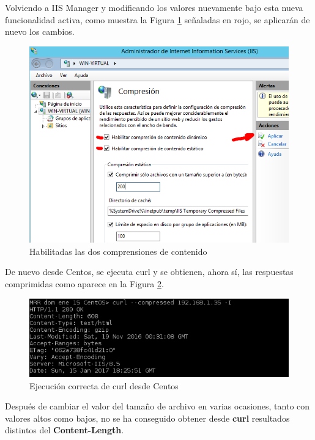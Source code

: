 Volviendo a IIS Manager y modificando los valores nuevamente bajo esta nueva funcionalidad activa, como muestra la Figura \ref{fig:figura5-6} señaladas en rojo, se aplicarán de nuevo los cambios.
	\begin{figure}[H] %
		\centering
		\includegraphics[scale=0.8]{figuras/ejercicio5/figura5-6.png} 
		\caption{Habilitadas las dos comprensiones de contenido} 
		\label{fig:figura5-6}
	\end{figure}
\vspace{-10pt}
De nuevo desde Centos, se ejecuta curl y se obtienen, ahora sí, las respuestas comprimidas como aparece en la Figura \ref{fig:figura5-7}.
	\begin{figure}[H] %
		\centering
		\includegraphics[scale=0.9]{figuras/ejercicio5/figura5-7.png} 
		\caption{Ejecución correcta de curl desde Centos} 
		\label{fig:figura5-7}
	\end{figure}
\vspace{-10pt}
Después de cambiar el valor del tamaño de archivo en varias ocasiones, tanto con valores altos como bajos, no se ha conseguido obtener desde \textbf{curl} resultados distintos del \textbf{Content-Length}.

